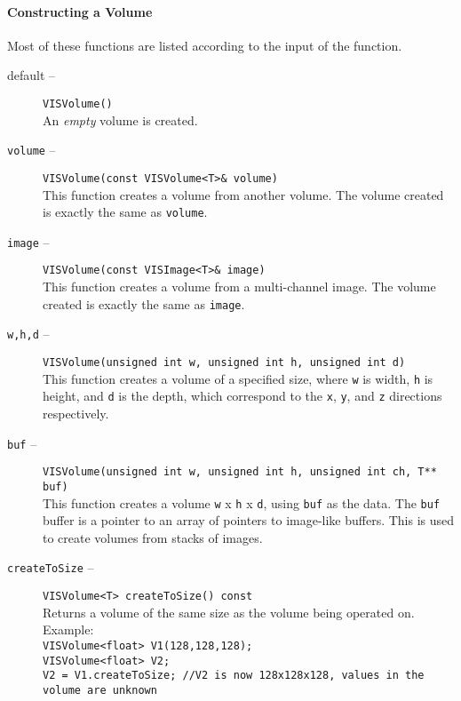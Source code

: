 \paragraph{Constructing a Volume}
Most of these functions are listed according to the input of the function.
\begin{description}
\item[default --]
{\tt VISVolume()}\\
An {\em empty} volume is created.
\item[{\tt volume} --]
{\tt VISVolume(const VISVolume<T>\& volume)}\\
This function creates a volume from another volume.
The volume created is exactly the same as {\tt volume}.
\item[{\tt image} --]
{\tt VISVolume(const VISImage<T>\& image)}\\
This function creates a volume from a multi-channel image.
The volume created is exactly the same as {\tt image}.
\item[{\tt w,h,d} --]
{\tt VISVolume(unsigned int w, unsigned int h, unsigned int d)}\\
This function creates a volume of a specified size,
where {\tt w} is width, {\tt h} is height, and {\tt d} is the depth,
which correspond to the {\tt x}, {\tt y}, and {\tt z} directions respectively.
\item[{\tt buf} --]
{\tt VISVolume(unsigned int w, unsigned int h, unsigned int ch, T** buf)}\\
This function creates a volume {\tt w} x {\tt h} x {\tt d},
using {\tt buf} as the data.  The {\tt buf} buffer is a pointer to an array 
of pointers to image-like buffers.  This is used to create volumes from 
stacks of images.
\item[{\tt createToSize} --]
{\tt VISVolume<T> createToSize() const}\\
Returns a volume of the same size as the volume being operated on.  Example:\\
{\tt VISVolume<float> V1(128,128,128);}\\
{\tt VISVolume<float> V2;}\\
{\tt V2 = V1.createToSize; //V2 is now 128x128x128, values in the volume are unknown}
\end{description}

